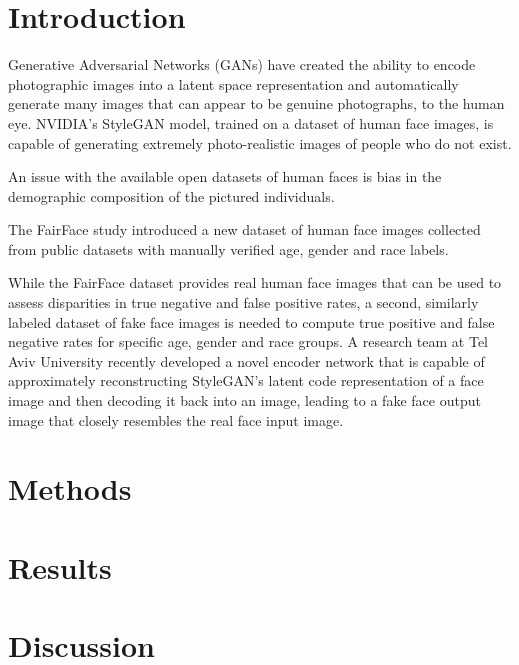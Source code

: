 \documentclass[12pt, letterpaper]{article}
\begin{document}
\begin{multicols}{2}
  \section{Introduction}
  Generative Adversarial Networks (GANs) have created the ability to
  encode photographic images into a latent space representation and
  automatically generate many images that can appear to be genuine
  photographs, to the human eye. NVIDIA's StyleGAN\cite{stylegan} model, trained
  on a dataset of human face images, is capable of generating extremely
  photo-realistic images of people who do not exist.

  An issue with the available open datasets of human faces is bias in the
  demographic composition of the pictured individuals.

  The FairFace\cite{karkkainen2019fairface} study introduced a new dataset of
  human face images collected from public datasets with manually verified age,
  gender and race labels.

  While the FairFace dataset provides real human face images that can be used to
  assess disparities in true negative and false positive rates, a second,
  similarly labeled dataset of fake face images is needed to compute true
  positive and false negative rates for specific age, gender and race groups.
  A research team at Tel Aviv University recently developed a novel encoder
  network\cite{richardson2020encoding} that is capable of approximately
  reconstructing StyleGAN's latent
  code representation of a face image and then decoding it back into an image,
  leading to a fake face output image that closely resembles the real face input
  image.
\section{Methods}
\section{Results}
\section{Discussion}
\end{multicols}



\end{document}
